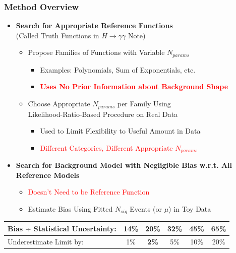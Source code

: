 \documentclass{beamer}
\newcommand{\tredbf}[1]{\textcolor{red}{\bf #1}}
\begin{document}
\begin{frame}
\frametitle{Method Overview}
  \begin{itemize}
    \item {\bf Search for Appropriate Reference Functions} \\ (Called Truth Functions in $H\rightarrow\gamma\gamma$ Note)
      \begin{itemize}
        \item Propose Families of Functions with Variable $N_{params}$
          \begin{itemize}
              \item Examples: Polynomials, Sum of Exponentials, etc.
              \item \tredbf{Uses No Prior Information about Background Shape}
          \end{itemize}
        \item Choose Appropriate $N_{params}$ per Family Using \\ 
                  Likelihood-Ratio-Based Procedure on Real Data
          \begin{itemize}
              \item Used to Limit Flexibility to Useful Amount in Data
              \item \textcolor{red}{ Different Categories, Different Appropriate $N_{params}$}
          \end{itemize}
      \end{itemize}
    \item {\bf Search for Background Model with Negligible Bias w.r.t. All Reference Models}
    \begin{itemize}
      \item \textcolor{red}{Doesn't Need to be Reference Function}
      \item Estimate Bias Using Fitted $N_{sig}$ Events (or $\mu$) in Toy Data
    \end{itemize}
  \end{itemize}
\begin{center}
  \small
  \begin{tabular}{|l|c|c|c|c|c|} \hline
    Bias $\div$ Statistical Uncertainty: & 14\% & \textbf{20\%} & 32\% & 45\% & 65\% \\ \hline
    Underestimate Limit by: & 1\% & \textbf{2\%} & 5\% & 10\% & 20\% \\ \hline
  \end{tabular}
\end{center}
\end{frame}
\end{document}
